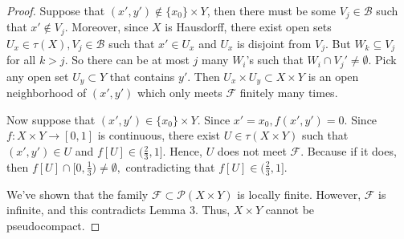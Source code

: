 \documentclass{amsart}
\begin{document}
\begin{proof}
Suppose that $(x',y') \notin \{x_0\}\times Y$, then there must be some $V_j \in \mathcal{B}$ such that $x'\notin V_j$. Moreover, since $X$ is Hausdorff, there exist open sets $U_x\in \tau(X), V_j\in \mathcal{B}$ such that $x'\in U_x$ and $U_x$ is disjoint from $V_j$. But $W_k \subseteq V_j $ for all $k>j.$ So there can be at most $j$ many $W_i$'s such that $W_i\cap V_j'\neq \emptyset.$ Pick any open set $U_y\subset Y$ that contains $y'$. Then $U_x\times U_y \subset X\times Y$ is an open neighborhood of $(x',y')$ which only meets $\mathcal{F}$ finitely many times.


Now suppose that $(x',y') \in \{x_0\}\times Y$. Since $x'=x_0, f(x',y')=0.$ Since $f:X\times Y \rightarrow [0,1]$ is 
continuous, there exist $U\in \tau(X\times Y)$ such that $(x',y')\in U$ and $f[U]\in (\frac{2}{3},1].$ Hence, $U$ does not meet $\mathcal{F}$. Because if it does, then $f[U]\cap [0,\frac{1}{3}) \neq \emptyset,$ contradicting that $f[U]\in (\frac{2}{3},1]$. 

We've shown that the family $\mathcal{F}\subset \mathcal{P}(X\times Y)$ is locally finite. However, $\mathcal{F}$ is infinite, and this contradicts Lemma 3. Thus, $X\times Y$ cannot be pseudocompact. 






\end{proof}
\end{document}
